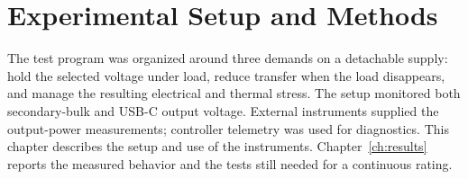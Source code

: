 \chapter{Experimental Setup and Methods}
\label{ch:methods}

The test program was organized around three demands on a detachable supply:
hold the selected voltage under load, reduce transfer when the load disappears,
and manage the resulting electrical and thermal stress. The setup monitored both
secondary-bulk and USB-C output voltage. External instruments supplied
the output-power measurements; controller telemetry was used for diagnostics. This chapter describes the setup and
use of the instruments. Chapter~\ref{ch:results} reports the measured behavior
and the tests still needed for a continuous rating.













